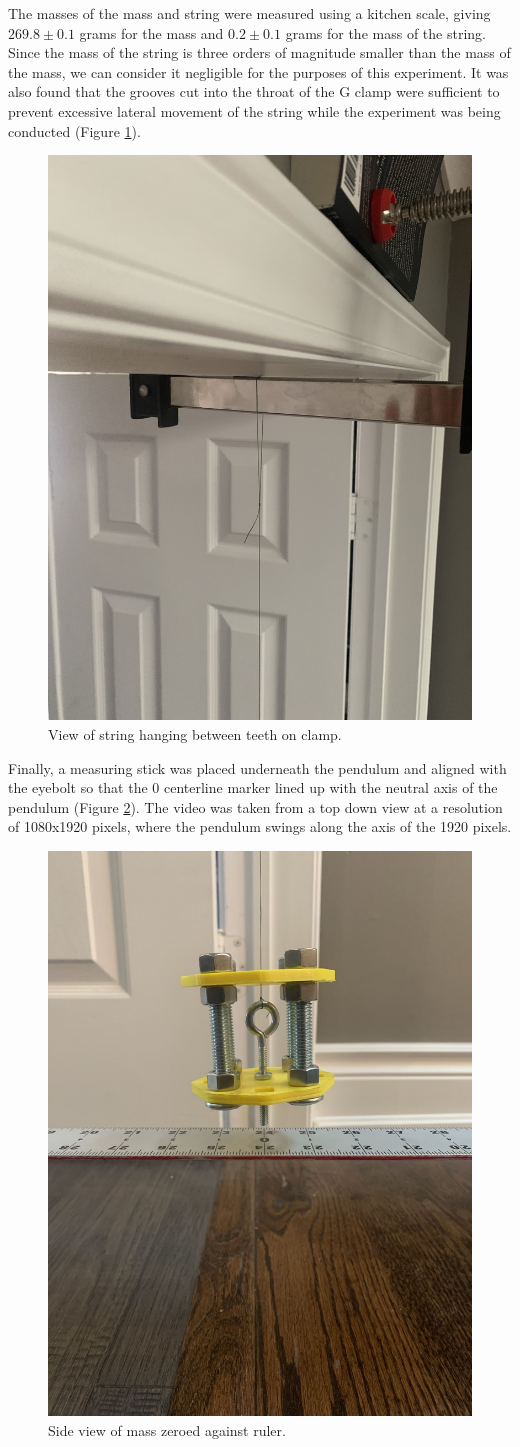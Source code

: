 \documentclass[11pt]{article}
\begin{document}
        The masses of the mass and string were measured using a kitchen scale, giving $269.8 \pm 0.1$ grams for the mass and $0.2 \pm 0.1$ grams for the mass of the string. Since the mass of the string is three orders of magnitude smaller than the mass of the mass, we can consider it negligible for the purposes of this experiment.
        It was also found that the grooves cut into the throat of the G clamp were sufficient to prevent excessive lateral movement of the string while the experiment was being conducted (Figure \ref{fig:clamp}).
        \begin{figure}[H]
            \centering\includegraphics[angle = 270, width=.45\linewidth]{clampView.jpg}
            \caption{View of string hanging between teeth on clamp.}
            \label{fig:clamp}
        \end{figure}

       Finally, a measuring stick was placed underneath the pendulum and aligned with the eyebolt so that the 0 centerline marker lined up with the neutral axis of the pendulum (Figure \ref{fig:zeroed}). The video was taken from a top down view at a resolution of 1080x1920 pixels, where the pendulum swings along the axis of the 1920 pixels.

        \begin{figure}[H]
            \centering\includegraphics[width = 0.4\linewidth]{zeroed.jpg}
            \caption{Side view of mass zeroed against ruler.}
            \label{fig:zeroed}
        \end{figure}
\end{document}
